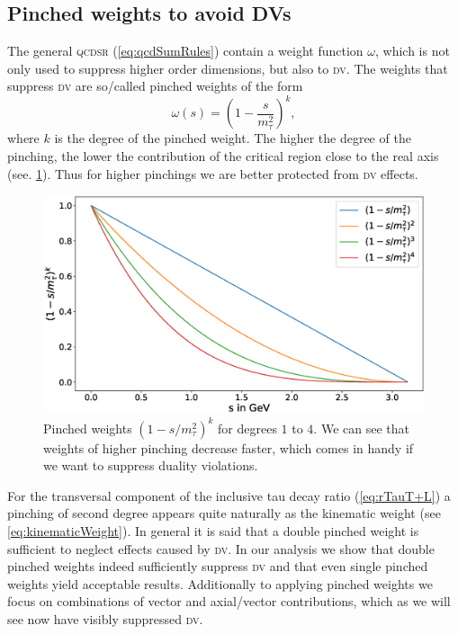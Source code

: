 \documentclass[../../index.tex]{subfiles}
\begin{document}
\subsection{Pinched weights to avoid DVs}
\label{sec:pinchedWeights}
The general \textsc{qcdsr} (\cref{eq:qcdSumRules}) contain a weight function
\(\omega\), which is not only used to suppress higher order dimensions, but also
to \textsc{dv}. The weights that suppress \textsc{dv} are so\-/called pinched
weights of the form
\begin{equation}
  \omega(s) = \left(1-\frac{s}{m_\tau^2}\right)^k,
\end{equation}
where \(k\) is the degree of the pinched weight. The higher the degree of the
pinching, the lower the contribution of the critical region close to the real
axis (see. \cref{fig:monomialWeightGraphs}). Thus for higher pinchings we are
better protected from \textsc{dv} effects.
\begin{figure}
  \centering
  \includegraphics[width=\textwidth]{./images/monomialWeightGraphs.eps}
  \caption{Pinched weights \((1-s/m_\tau^2)^k\) for degrees \(1\) to \(4\). We
    can see that weights of higher pinching decrease faster, which comes in
    handy if we want to suppress duality violations.}
  \label{fig:monomialWeightGraphs}
\end{figure}
For the transversal component of the inclusive tau decay ratio
(\cref{eq:rTauT+L}) a pinching of second degree appears quite naturally as the
kinematic weight (see \cref{eq:kinematicWeight}). In general it is said that a
double pinched weight is sufficient to neglect effects caused by \textsc{dv}. In
our analysis we show that double pinched weights indeed sufficiently suppress
\textsc{dv} and that even single pinched weights yield acceptable results.
Additionally to applying pinched weights we focus on combinations of vector and
axial\-/vector contributions, which as we will see now have visibly suppressed
\textsc{dv}.
\end{document}
